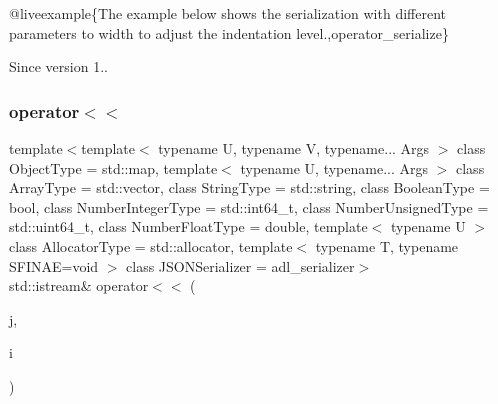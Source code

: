 @liveexample\{The example below shows the serialization with different parameters to {\ttfamily width} to adjust the indentation level.,operator\+\_\+serialize\}

\begin{DoxySince}{Since}
version 1.. 
\end{DoxySince}
\mbox{\label{classnlohmann_1_1basic__json_a60ca396028b8d9714c6e10efbf475af6}} 
\subsubsection{\texorpdfstring{operator$<$$<$}{operator<<}\hspace{0.1cm}{\footnotesize\ttfamily [2/2]}}
{\footnotesize\ttfamily template$<$template$<$ typename U, typename V, typename... Args $>$ class Object\+Type = std\+::map, template$<$ typename U, typename... Args $>$ class Array\+Type = std\+::vector, class String\+Type  = std\+::string, class Boolean\+Type  = bool, class Number\+Integer\+Type  = std\+::int64\+\_\+t, class Number\+Unsigned\+Type  = std\+::uint64\+\_\+t, class Number\+Float\+Type  = double, template$<$ typename U $>$ class Allocator\+Type = std\+::allocator, template$<$ typename T, typename S\+F\+I\+N\+A\+E=void $>$ class J\+S\+O\+N\+Serializer = adl\+\_\+serializer$>$ \\
std\+::istream\& operator$<$$<$ (\begin{DoxyParamCaption}\item[{\mbox{\hyperlink{classnlohmann_1_1basic__json}{basic\+\_\+json}}$<$ Object\+Type, Array\+Type, String\+Type, Boolean\+Type, Number\+Integer\+Type, Number\+Unsigned\+Type, Number\+Float\+Type, Allocator\+Type, J\+S\+O\+N\+Serializer $>$ \&}]{j,  }\item[{std\+::istream \&}]{i }\end{DoxyParamCaption})\hspace{0.3cm}{\ttfamily [friend]}}



